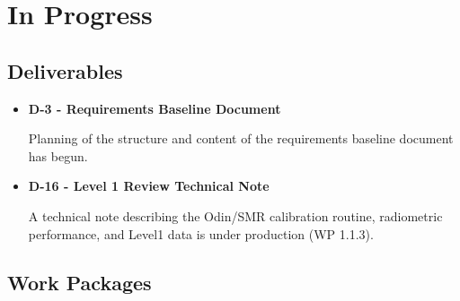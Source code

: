 \chapter{In Progress}
\label{chapter:in_progress}

\section{Deliverables}

\begin{itemize}

\item{\bf D-3 - Requirements Baseline Document}

Planning of the structure and content of the requirements baseline document has begun.

\item{\bf D-16 - Level 1 Review Technical Note}

A technical note describing the Odin/SMR calibration
routine, radiometric performance, and Level1 data is under production (WP 1.1.3). 
      

\end{itemize}


\section{Work Packages}

